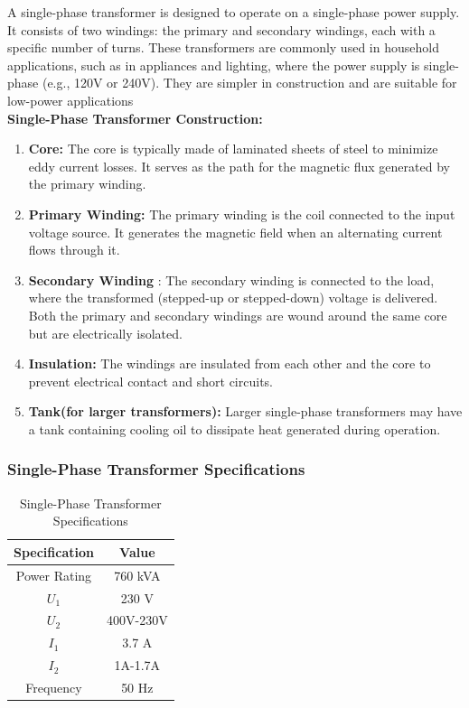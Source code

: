 \documentclass[a4paper,12pt]{article}
\begin{document}
A single-phase transformer is designed to operate on a single-phase power supply. It consists of two windings: the primary and secondary windings, each with a specific number of turns. These transformers are commonly used in household applications, such as in appliances and lighting, where the power supply is single-phase (e.g., 120V or 240V). They are simpler in construction and are suitable for low-power applications\\[0.2cm]
\textbf{	Single-Phase Transformer Construction:}
\begin{enumerate}
\item \textbf{Core: }
The core is typically made of laminated sheets of steel to minimize eddy current losses. It serves as the path for the magnetic flux generated by the primary winding.
\item \textbf{Primary Winding:}  The primary winding is the coil connected to the input voltage source. It generates the magnetic field when an alternating current flows through it.
\item \textbf{Secondary Winding }: The secondary winding is connected to the load, where the transformed (stepped-up or stepped-down) voltage is delivered. Both the primary and secondary windings are wound around the same core but are electrically isolated.
\item \textbf{Insulation:}  The windings are insulated from each other and the core to prevent electrical contact and short circuits.
\item \textbf{Tank(for larger transformers):}   Larger single-phase transformers may have a tank containing cooling oil to dissipate heat generated during operation.
\end{enumerate}

\subsubsection{Single-Phase Transformer Specifications}
\begin{table}[H]
	\centering
	\caption{Single-Phase Transformer Specifications}
	\begin{tabular}{| c |c |}
		\hline
		\textbf{Specification} & \textbf{Value} \\ \hline
		Power Rating & 760 kVA \\ \hline
		$U_1$  & 230 V \\ \hline
		$U_2$  & 400V-230V \\ \hline
		$I_1$ & 3.7 A \\ \hline
		$I_2$ & 1A-1.7A \\ \hline
		Frequency & 50 Hz \\ \hline
		
	\end{tabular}
	
	
	\label{tab:3}
\end{table}
\end{document}
